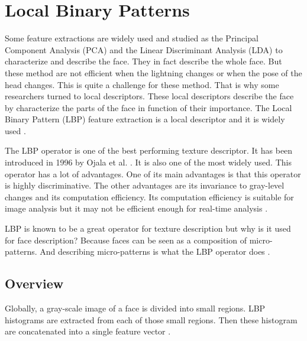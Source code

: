 \chapter{Local Binary Patterns}
\label{chap:lbp}

\noindent Some feature extractions are widely used and studied as the Principal Component Analysis (PCA) and the Linear Discriminant Analysis (LDA) to characterize and describe the face. They in fact describe the whole face. But these method are not efficient when the lightning changes or when the pose of the head changes. This is quite a challenge for these method. That is why some researchers turned to local descriptors. These local descriptors describe the face by characterize the parts of the face in function of their importance. The Local Binary Pattern (LBP) feature extraction is a local descriptor and it is widely used \cite{AHO06}.
\newline

\noindent The LBP operator is one of the best performing texture descriptor. It has been introduced in 1996 by Ojala et al. \cite{OJA96}. It is also one of the most widely used. This operator has a lot of advantages. One of its main advantages is that this operator is highly discriminative. The other advantages are its invariance to gray-level changes and its computation efficiency. Its computation efficiency is suitable for image analysis but it may not be efficient enough for real-time analysis \cite{AHO06}.
\newline

\noindent LBP is known to be a great operator for texture description but why is it used for face description? Because faces can be seen as a composition of micro-patterns. And describing micro-patterns is what the LBP operator does \cite{AHO06}.
\newline

\section{Overview}

\vspace{\baselineskip}
\noindent Globally, a gray-scale image of a face is divided into small regions. LBP histograms are extracted from each of those small regions. Then these histogram are concatenated into a single feature vector \cite{JUL07}.
\newline

